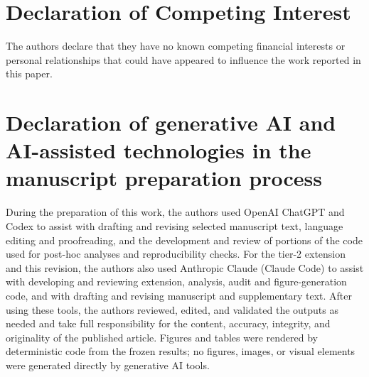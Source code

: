\documentclass[a4paper,fleqn]{cas-dc}
\begin{document}
\section*{Declaration of Competing Interest}

The authors declare that they have no known competing financial interests or
personal relationships that could have appeared to influence the work reported
in this paper.

\section*{Declaration of generative AI and AI-assisted technologies in the manuscript preparation process}

During the preparation of this work, the authors used OpenAI ChatGPT and Codex
to assist with drafting and revising selected manuscript text, language editing
and proofreading, and the development and review of portions of the code used
for post-hoc analyses and reproducibility checks. For the tier-2 extension and
this revision, the authors also used Anthropic Claude (Claude Code) to assist
with developing and reviewing extension, analysis, audit and
figure-generation code, and with drafting and revising manuscript and
supplementary text. After using these tools, the
authors reviewed, edited, and validated the outputs as needed and take full
responsibility for the content, accuracy, integrity, and originality of the
published article. Figures and tables were rendered by deterministic code
from the frozen results; no figures, images, or visual elements were
generated directly by generative AI tools.




\end{document}
